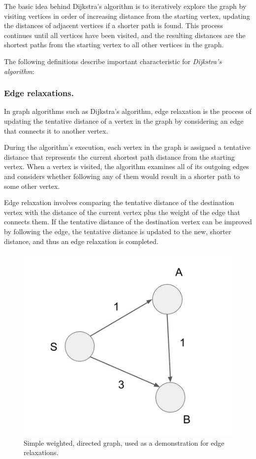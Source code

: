 \documentclass{l4proj}
\begin{document}
The basic idea behind Dijkstra's algorithm is to iteratively explore the graph by visiting vertices in order of increasing distance from the starting vertex, updating the distances of adjacent vertices if a shorter path is found. This process continues until all vertices have been visited, and the resulting distances are the shortest paths from the starting vertex to all other vertices in the graph.

The following definitions describe important characteristic for \emph{Dijkstra's algorithm}:
\subsubsection{Edge relaxations.}

In graph algorithms such as Dijkstra's algorithm, edge relaxation is the process of updating the tentative distance of a vertex in the graph by considering an edge that connects it to another vertex.

During the algorithm's execution, each vertex in the graph is assigned a tentative distance that represents the current shortest path distance from the starting vertex. When a vertex is visited, the algorithm examines all of its outgoing edges and considers whether following any of them would result in a shorter path to some other vertex.

Edge relaxation involves comparing the tentative distance of the destination vertex with the distance of the current vertex plus the weight of the edge that connects them. If the tentative distance of the destination vertex can be improved by following the edge, the tentative distance is updated to the new, shorter distance, and thus an edge relaxation is completed. 

\begin{figure}[!h]
    \centering
    \includegraphics[width=0.6\linewidth]{images/edge_relaxation.png}    
    \caption[Caption]{Simple weighted, directed graph, used as a demonstration for edge relaxations. \footnotemark}
    \label{fig:edge_r} 
\end{figure}
\end{document}
